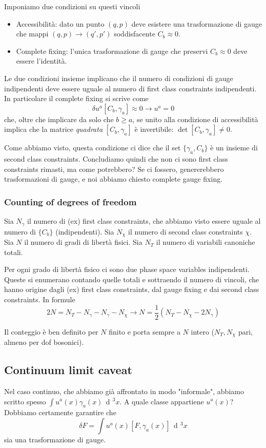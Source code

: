 \documentclass[a4paper, 11pt]{article}
\newcommand{\dd}{\mathop{\mathrm{d}\!}{}}
\begin{document}
	Imponiamo due condizioni su questi vincoli
	\begin{itemize}
		\item Accessibilità: dato un punto $(q,p)$ deve esistere una trasformazione di gauge che mappi $(q,p)\rightarrow(q',p')$ soddisfacente $C_b\approx 0$.
		\item Complete fixing: l'unica trasformazione di gauge che preservi $C_b\approx 0$ deve essere l'identità.
	\end{itemize}
	Le due condizioni insieme implicano che il numero di condizioni di gauge indipendenti deve essere uguale al numero di first class constraints indipendenti. In particolare il complete fixing si scrive come
	\[ \delta u^a [C_b, \gamma_a] \approx 0 \rightarrow u^a = 0 \]
	che, oltre che implicare da solo che $b\ge a$, se unito alla condizione di accessibilità implica che la matrice \emph{quadrata} $[C_b,\gamma_a]$ è invertibile: $\det [C_b,\gamma_a] \neq 0$.
	
	Come abbiamo visto, questa condizione ci dice che il set $\{\gamma_a,C_b\}$ è un insieme di second class constraints. Concludiamo quindi che non ci sono first class constraints rimasti, ma come potrebbero? Se ci fossero, genererebbero trasformazioni di gauge, e noi abbiamo chiesto complete gauge fixing.
	
	\subsubsection{Counting of degrees of freedom}
	Sia $N_\gamma$ il numero di (ex) first class constraints, che abbiamo visto essere uguale al numero di $\{C_b\}$ (indipendenti). Sia $N_\chi$ il numero di second class constraints $\chi$. Sia $N$ il numero di gradi di libertà fisici. Sia $N_T$ il numero di variabili canoniche totali.
	
	Per ogni grado di libertà fisico ci sono due phase space variables indipendenti. Queste si enumerano contando quelle totali e sottraendo il numero di vincoli, che hanno origine dagli (ex) first class constraints, dal gauge fixing e dai second class constraints. In formule
	\[ 2N = N_T - N_\gamma- N_\gamma - N_\chi \rightarrow N = \dfrac{1}{2} (N_T-N_\chi-2N_\gamma) \]
	
	Il conteggio è ben definito per $N$ finito e porta sempre a $N$ intero ($N_T,N_\chi$ pari, almeno per dof bosonici).
	
	\subsection{Continuum limit caveat}
	Nel caso continuo, che abbiamo già affrontato in modo "informale", abbiamo scritto spesso $\int u^a(x) \gamma_a(x)\,\dd^3 x$. A quale classe appartiene $u^a(x)$? Dobbiamo certamente garantire che
	\[ \delta F = \int u^a(x) [F,\gamma_a(x)]\,\dd^3x \]
	sia una trasformazione di gauge.
	
\end{document}
